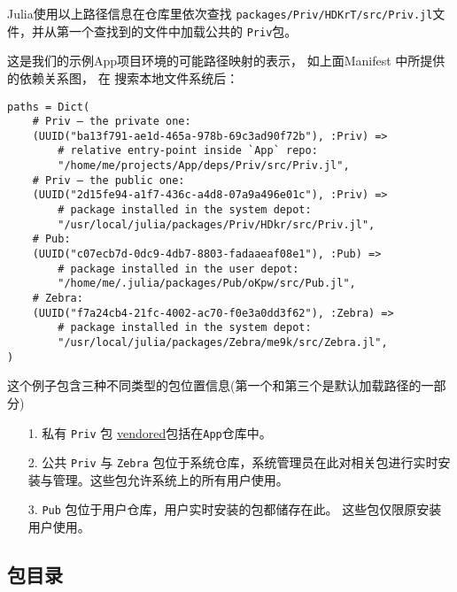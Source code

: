 Julia使用以上路径信息在仓库里依次查找 \texttt{packages/Priv/HDKrT/src/Priv.jl}文件，并从第一个查找到的文件中加载公共的 \texttt{Priv}包。



这是我们的示例App项目环境的可能路径映射的表示，  如上面Manifest 中所提供的依赖关系图， 在 搜索本地文件系统后：




\begin{verbatim}
paths = Dict(
    # Priv – the private one:
    (UUID("ba13f791-ae1d-465a-978b-69c3ad90f72b"), :Priv) =>
        # relative entry-point inside `App` repo:
        "/home/me/projects/App/deps/Priv/src/Priv.jl",
    # Priv – the public one:
    (UUID("2d15fe94-a1f7-436c-a4d8-07a9a496e01c"), :Priv) =>
        # package installed in the system depot:
        "/usr/local/julia/packages/Priv/HDkr/src/Priv.jl",
    # Pub:
    (UUID("c07ecb7d-0dc9-4db7-8803-fadaaeaf08e1"), :Pub) =>
        # package installed in the user depot:
        "/home/me/.julia/packages/Pub/oKpw/src/Pub.jl",
    # Zebra:
    (UUID("f7a24cb4-21fc-4002-ac70-f0e3a0dd3f62"), :Zebra) =>
        # package installed in the system depot:
        "/usr/local/julia/packages/Zebra/me9k/src/Zebra.jl",
)
\end{verbatim}



这个例子包含三种不同类型的包位置信息(第一个和第三个是默认加载路径的一部分)



\begin{itemize}
\item[1. ] 私有 \texttt{Priv} 包 {\textquotedbl}\href{https://stackoverflow.com/a/35109534}{vendored}{\textquotedbl}包括在\texttt{App}仓库中。


\item[2. ] 公共 \texttt{Priv} 与 \texttt{Zebra} 包位于系统仓库，系统管理员在此对相关包进行实时安装与管理。这些包允许系统上的所有用户使用。


\item[3. ] \texttt{Pub} 包位于用户仓库，用户实时安装的包都储存在此。 这些包仅限原安装用户使用。

\end{itemize}


\hypertarget{9048837682653155362}{}


\subsection{包目录}



